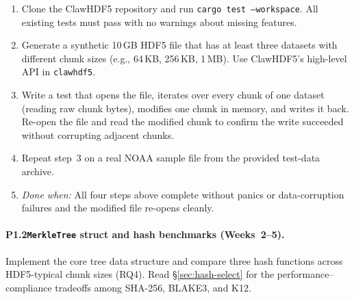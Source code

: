 \documentclass[11pt]{article}
\begin{document}
\begin{enumerate}[nosep]
  \item Clone the ClawHDF5 repository and run \texttt{cargo test --workspace}.
    All existing tests must pass with no warnings about missing features.
  \item Generate a synthetic 10\,GB HDF5 file that has at least three datasets
    with different chunk sizes (e.g., 64\,KB, 256\,KB, 1\,MB). Use
    ClawHDF5's high-level API in \texttt{clawhdf5}.
  \item Write a test that opens the file, iterates over every chunk of one
    dataset (reading raw chunk bytes), modifies one chunk in memory, and
    writes it back. Re-open the file and read the modified chunk to confirm
    the write succeeded without corrupting adjacent chunks.
  \item Repeat step~3 on a real NOAA sample file from the provided test-data
    archive.
  \item \emph{Done when:} All four steps above complete without panics or
    data-corruption failures and the modified file re-opens cleanly.
\end{enumerate}

\paragraph{P1.2\enspace \texttt{MerkleTree} struct and hash benchmarks
(Weeks~2--5).}
Implement the core tree data structure and compare three hash functions across
HDF5-typical chunk sizes (RQ4). Read \S\ref{sec:hash-select} for the
performance--compliance tradeoffs among SHA-256, BLAKE3, and K12.
\end{document}
